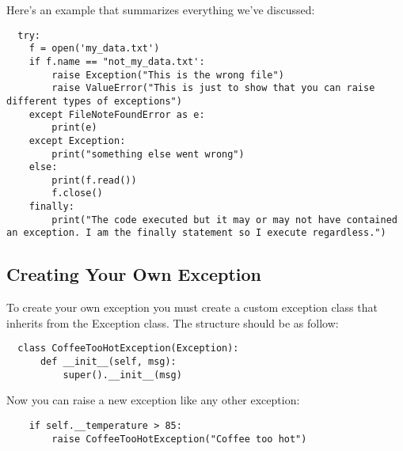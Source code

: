\documentclass{article}%
\begin{document}
Here's an example that summarizes everything we've discussed:
\begin{lstlisting}
  try:
    f = open('my_data.txt')
    if f.name == "not_my_data.txt':
        raise Exception("This is the wrong file")
        raise ValueError("This is just to show that you can raise different types of exceptions")
    except FileNoteFoundError as e:
        print(e)
    except Exception:
        print("something else went wrong")
    else:
        print(f.read())
        f.close()
    finally:
        print("The code executed but it may or may not have contained an exception. I am the finally statement so I execute regardless.")
\end{lstlisting}

\subsection{Creating Your Own Exception}
To create your own exception you must create a custom exception class that inherits from the Exception class. The structure should be as follow:
\begin{lstlisting}
  class CoffeeTooHotException(Exception):
      def __init__(self, msg):
          super().__init__(msg)
\end{lstlisting}

Now you can raise a new exception like any other exception:
\begin{lstlisting}
    if self.__temperature > 85:
        raise CoffeeTooHotException("Coffee too hot")
\end{lstlisting}
\end{document}
